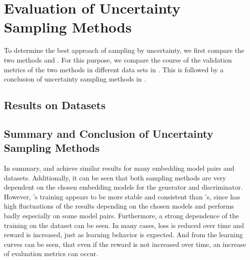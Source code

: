 \section{Evaluation of Uncertainty Sampling Methods}
\label{ch:evaluation:sec:evaluation_methods}
%
To determine the best approach of sampling by uncertainty, we first compare the two methods \usmax and \ussoftmax.
For this purpose, we compare the course of the validation metrics of the two methods in different data sets in .
This is followed by a conclusion of uncertainty sampling methods in  .
%
\subsection{Results on Datasets} \label{subsec:methods_results}














%
\subsection{Summary and Conclusion of Uncertainty Sampling Methods} 
\label{subsec:methods_conclusion}
In summary, \usmax and \ussoftmax achieve similar results for many embedding model pairs and datasets.
Additionally, it can be seen that both sampling methods are very dependent on the chosen embedding models for the generator and discriminator.
However, \ussoftmax's training appears to be more stable and consistent than \usmax's, since \usmax has high fluctuations of the results depending on the chosen models and performs badly especially on some model pairs.
Furthermore, a strong dependence of the training on the dataset can be seen.
In many cases, loss is reduced over time and reward is increased, just as learning behavior is expected.
And from the learning curves can be seen, that even if the reward is not increased over time, an increase of evaluation metrics can occur.

